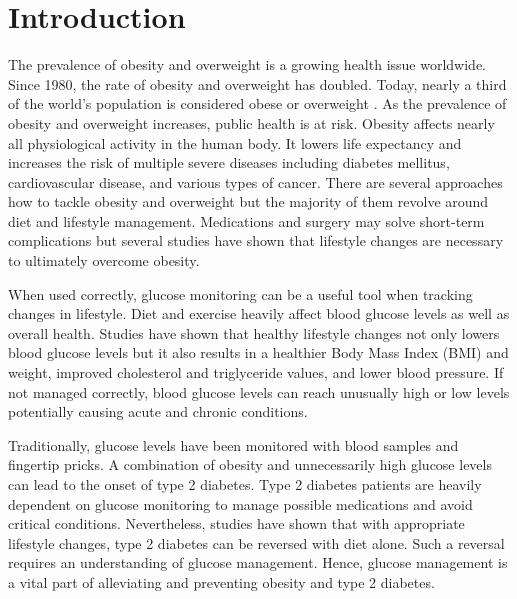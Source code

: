 \documentclass[english, 12pt, a4paper, elec, utf8, a-1b, online]{aaltothesis}
\begin{document}
\cleardoublepage


\section{Introduction}
\thispagestyle{empty}

The prevalence of obesity and overweight is a growing 
health issue worldwide. Since 1980, the rate of obesity 
and overweight has doubled. Today, nearly a third of 
the world's population is considered obese or overweight 
\cite{chooi_epidemiology_2019}. As the prevalence of obesity and overweight 
increases, public health is at risk. Obesity affects 
nearly all physiological activity in the human body. It 
lowers life expectancy and increases the risk of multiple 
severe diseases including diabetes mellitus, 
cardiovascular disease, and various types of cancer\cite{chooi_epidemiology_2019}\cite{nammi_obesity_2004}. 
There are several approaches how to tackle obesity and 
overweight but the majority of them revolve around 
diet and lifestyle management. Medications and surgery may solve 
short-term complications but several studies have shown 
that lifestyle changes are necessary to ultimately 
overcome obesity\cite{nammi_obesity_2004}\cite{mauro_barriers_2008}\cite{powell_effective_2007}\cite{marquis-gravel_intensive_2015}.

When used correctly, glucose monitoring can be a useful tool when tracking 
changes in lifestyle. Diet and exercise heavily affect blood
glucose levels as well as overall health. Studies have shown that healthy lifestyle changes
not only lowers blood glucose levels but it also results in a healthier Body Mass Index (BMI) and weight,
improved cholesterol and triglyceride values, and lower blood pressure\cite{yamaoka_effects_2012}.
If not managed correctly, blood glucose levels can reach unusually high or low levels potentially causing 
acute and chronic conditions\cite{mathew_blood_2022}.  

Traditionally, glucose levels have been monitored with blood 
samples and fingertip pricks. A combination of obesity
and unnecessarily high glucose levels can lead to the onset of type 2 diabetes\cite{garber_obesity_2012}.
Type 2 diabetes patients are heavily dependent on glucose monitoring 
to manage possible medications and avoid critical conditions\cite{ripsin_management_2009}. 
Nevertheless, studies have shown that
with appropriate lifestyle changes, type 2 diabetes can be reversed with diet alone\cite{taylor_type_2013}. 
Such a reversal requires an understanding of glucose management.
Hence, glucose management is a vital part of alleviating and 
preventing obesity and type 2 diabetes.
\end{document}
